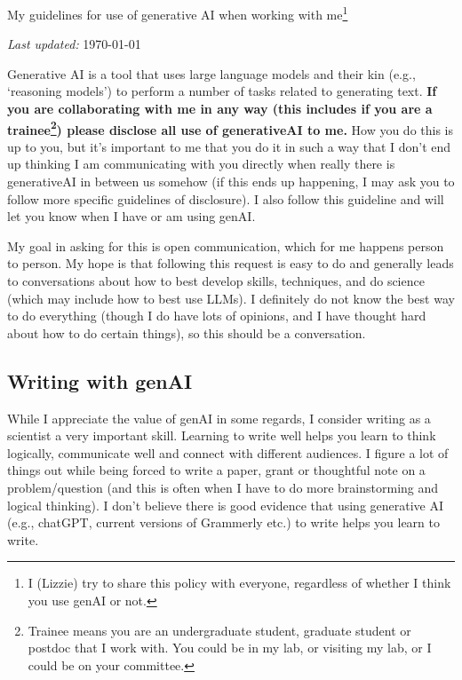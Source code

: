 \documentclass[11pt]{article}
\begin{document}

\renewcommand{\refname}{\CHead{}}


{\Large My guidelines for use of generative AI when working with me}\footnote[1]{I (Lizzie) try to share this policy with everyone, regardless of whether I think you use genAI or not.}


\emph{Last updated:} \today

Generative AI is a tool that uses large language models and their kin (e.g., `reasoning models') to perform a number of tasks related to generating text. {\bf If you are collaborating with me in any way (this includes if you are a trainee\footnote[2]{Trainee means you are an undergraduate student, graduate student or postdoc that I work with. You could be in my lab, or visiting my lab, or I could be on your committee.}) please disclose all use of generativeAI to me.} How you do this is up to you, but it's important to me that you do it in such a way that I don't end up thinking I am communicating with you directly when really there is generativeAI in between us somehow (if this ends up happening, I may ask you to follow more specific guidelines of disclosure). I also follow this guideline and will let you know when I have or am using genAI. 

My goal in asking for this is open communication, which for me happens person to person. My hope is that following this request is easy to do and generally leads to conversations about how to best develop skills, techniques, and do science (which may include how to best use LLMs). I definitely do not know the best way to do everything (though I do have lots of opinions, and I have thought hard about how to do certain things), so this should be a conversation. 


\subsection*{Writing with genAI}

While I appreciate the value of genAI in some regards, I consider writing as a scientist a very important skill. Learning to write well helps you learn to think logically, communicate well and connect with different audiences. I figure a lot of things out while being forced to write a paper, grant or thoughtful note on a problem/question (and this is often when I have to do more brainstorming and logical thinking). I don't believe there is good evidence that using generative AI (e.g., chatGPT, current versions of Grammerly etc.) to write helps you learn to write. 
\end{document}
